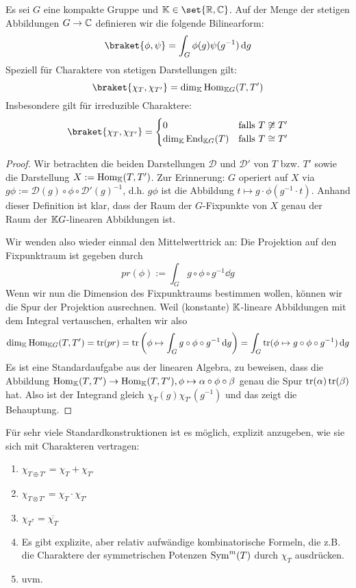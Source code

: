 \begin{theorem}[1.Orthogonalitätsrelation]
Es sei $G$ eine kompakte Gruppe und $\IK\in\set{\IR,\IC}$. Auf der Menge der stetigen Abbildungen $G\to\mathbb{C}$ definieren wir die folgende Bilinearform:
\[\braket{\phi,\psi} = \int_G \phi(g)\psi(g^{-1}) \dd g\]
Speziell für Charaktere von stetigen Darstellungen gilt:
\[\braket{\chi_T, \chi_{T'}} = \dim_\IK \Hom_{\IK G}(T,T')\]
Insbesondere gilt für irreduzible Charaktere:
\[\braket{\chi_T, \chi_{T'}} = \begin{cases} 0 & \text{falls }T\not\isomorphic T' \\ \dim_\IK \End_{\IK G}(T) & \text{falls }T\isomorphic T'\end{cases}\]
\end{theorem}
\begin{proof}
Wir betrachten die beiden Darstellungen $\mathcal{D}$ und $\mathcal{D}'$ von $T$ bzw. $T'$ sowie die Darstellung $X:=\operatorname{Hom}_{\mathbb{K}}(T,T')$. Zur Erinnerung: $G$ operiert auf $X$ via $g\phi := \mathcal{D}(g)\circ\phi\circ \mathcal{D}'(g)^{-1}$, d.h. $g\phi$ ist die Abbildung $t\mapsto g\cdot\phi(g^{-1}\cdot t)$. Anhand dieser Definition ist klar, dass der Raum der $G$-Fixpunkte von $X$ genau der Raum der $\mathbb{K} G$-linearen Abbildungen ist.

\smallbreak
Wir wenden also wieder einmal den Mittelwerttrick an: Die Projektion auf den Fixpunktraum ist gegeben durch
\[pr(\phi) := \int_G g\circ\phi\circ g^{-1} \dd g\]
Wenn wir nun die Dimension des Fixpunktraums bestimmen wollen, können wir die Spur der Projektion ausrechnen. Weil (konstante) $\mathbb{K}$-lineare Abbildungen mit dem Integral vertauschen, erhalten wir also
\[\dim_{\mathbb{K}} \operatorname{Hom}_{\mathbb{K} G}(T,T') = \operatorname{tr}(pr) = \operatorname{tr}\left(\phi \mapsto \int_G g\circ\phi\circ g^{-1} \,\textrm{d} g \right) = \int_G \operatorname{tr}(\phi \mapsto g\circ \phi\circ g^{-1}) \,\textrm{d} g\]
Es ist eine Standardaufgabe aus der linearen Algebra, zu beweisen, dass die Abbildung $\operatorname{Hom}_{\mathbb{K}}(T,T') \to \operatorname{Hom}_{\mathbb{K}}(T,T'), \phi \mapsto \alpha\circ\phi\circ\beta$ genau die Spur $\operatorname{tr}(\alpha)\operatorname{tr}(\beta)$ hat. Also ist der Integrand gleich $\chi_T(g)\chi_{T'}(g^{-1})$ und das zeigt die Behauptung.
\end{proof}

\begin{remark}
Für sehr viele Standardkonstruktionen ist es möglich, explizit anzugeben, wie sie sich mit Charakteren vertragen:
\begin{enumerate}
\item $\chi_{T\oplus T'} = \chi_T + \chi_{T'}$
\item $\chi_{T\otimes T'} = \chi_T \cdot \chi_{T'}$
\item $\chi_{T^\ast} = \overline{\chi_T}$
\item Es gibt explizite, aber relativ aufwändige kombinatorische Formeln, die z.B. die Charaktere der symmetrischen Potenzen $\operatorname{Sym}^m(T)$ durch $\chi_T$ ausdrücken.
\item uvm.
\end{enumerate}
\end{remark}

